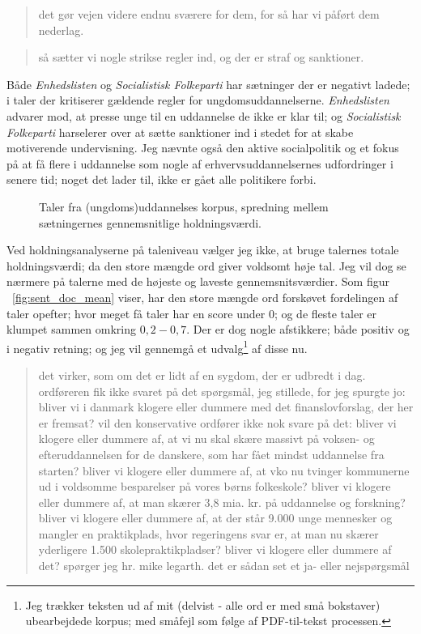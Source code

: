 \begin{quotation}
 det gør vejen videre endnu sværere for dem, for så har vi påført dem nederlag.
\end{quotation}

\begin{quotation}
så sætter vi nogle strikse regler ind, og der er straf og sanktioner.
\end{quotation}

Både \textit{Enhedslisten} og \textit{Socialistisk Folkeparti} har sætninger der er negativt ladede; i taler der kritiserer gældende regler for ungdomsuddannelserne.
\textit{Enhedslisten} advarer mod, at presse unge til en uddannelse de ikke er klar til; og \textit{Socialistisk Folkeparti} harselerer over at sætte sanktioner ind i stedet for at skabe motiverende undervisning.
Jeg nævnte også den aktive socialpolitik og et fokus på at få flere i uddannelse som nogle af erhvervsuddannelsernes udfordringer i senere tid; noget det lader til, ikke er gået alle politikere forbi.

\begin{figure}
  
\caption{Taler fra (ungdoms)uddannelses korpus, spredning mellem sætningernes gennemsnitlige holdningsværdi.}
\label{fig:sent_meanminmax}
\end{figure}

Ved holdningsanalyserne på taleniveau vælger jeg ikke, at bruge talernes totale holdningsværdi; da den store mængde ord giver voldsomt høje tal.
Jeg vil dog se nærmere på talerne med de højeste og laveste gennemsnitsværdier.
Som figur ~\ref{fig:sent_doc_mean} viser, har den store mængde ord forskøvet fordelingen af taler opefter; hvor meget få taler har en score under 0; og de fleste taler er klumpet sammen omkring $0,2-0,7$.
Der er dog nogle afstikkere; både positiv og i negativ retning; og jeg vil gennemgå et udvalg\footnote{Jeg trækker teksten ud af mit (delvist - alle ord er med små bokstaver) ubearbejdede korpus; med småfejl som følge af PDF-til-tekst processen.} af disse nu.

\begin{quotation}
det virker, som om det er lidt af en sygdom, der er udbredt i dag. ordføreren fik ikke svaret på det spørgsmål, jeg stillede, for jeg spurgte jo: bliver vi i danmark klogere eller dummere med det finanslovforslag, der her er fremsat? vil den konservative ordfører ikke nok svare på det: bliver vi klogere eller dummere af, at vi nu skal skære massivt på voksen- og efteruddannelsen for de danskere, som har fået mindst uddannelse fra starten? bliver vi klogere eller dummere af, at vko nu tvinger kommunerne ud i voldsomme besparelser på vores børns folkeskole? bliver vi klogere eller dummere af, at man skærer 3,8 mia. kr. på uddannelse og forskning? bliver vi klogere eller dummere af, at der står 9.000 unge mennesker og mangler en praktikplads, hvor regeringens svar er, at man nu skærer yderligere 1.500 skolepraktikpladser? bliver vi klogere eller dummere af det? spørger jeg hr. mike legarth. det er sådan set et ja- eller nejspørgsmål
\end{quotation}

